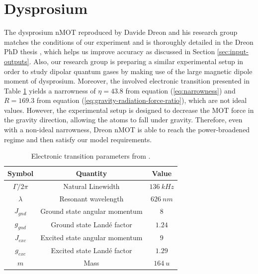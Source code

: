 %
\section{Dysprosium}
\label{sec:dysprosium}
%

The dysprosium nMOT \cite{dreon2017optical} reproduced by Davide Dreon and his research group matches the conditions of our experiment and is thoroughly detailed in the Dreon PhD thesis \cite{dreon2017designing}, which helps us improve accuracy as discussed in Section \ref{sec:input-outputs}. Also, our research group is preparing a similar experimental setup in order to study dipolar quantum gases by making use of the large magnetic dipole moment of dysprosium. Moreover, the involved electronic transition presented in Table \ref{tab:electronic-transition-Dy-Dreon} yields a narrowness of $ \eta =  43.8 $ from equation (\ref{eq:narrowness}) and $ R = 169.3 $ from equation (\ref{eq:gravity-radiation-force-ratio}), which are not ideal values. However, the experimental setup is designed to decrease the MOT force in the gravity direction, allowing the atoms to fall under gravity. Therefore, even with a non-ideal narrowness, Dreon nMOT is able to reach the power-broadened regime and then satisfy our model requirements.

\begin{table}[ht!]
    \centering
    \begin{tabular}{|c|c|c|}
        \hline
        \textbf{Symbol} & \textbf{Quantity} & \textbf{Value} \\ \hline
        $ \Gamma / 2\pi $ & Natural Linewidth & $ 136\ kHz $ \\
        $ \lambda $ & Resonant wavelength & $ 626\ nm $ \\
        $ J_{gnd} $ & Ground state angular momentum & $ 8 $ \\
        $ g_{gnd} $ & Ground state Landé factor & $ 1.24 $ \\
        $ J_{exc} $ & Excited state angular momentum & $ 9 $ \\
        $ g_{exc} $ & Excited state Landé factor & $ 1.29 $ \\
        $ m $ & Mass & $ 164\ u $ \\
        \hline
    \end{tabular}
    \caption{Electronic transition parameters from \cite{dreon2017designing}.}
    \label{tab:electronic-transition-Dy-Dreon}
\end{table}

